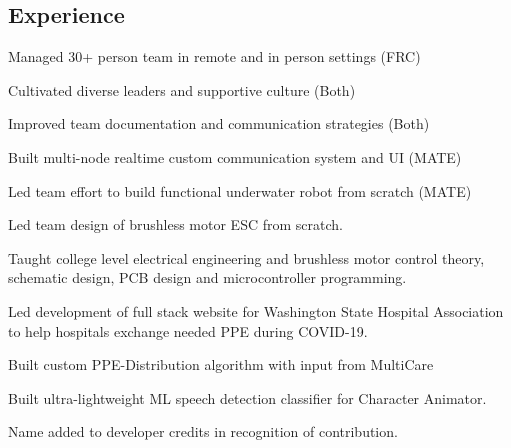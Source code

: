 \documentclass[]{deedy-resume-openfont}
\begin{document}
\begin{paracol}{2}
\section{Experience}
\vspace{\topsep}
\begin{tightemize}
\item Managed 30+ person team in remote and in person settings (FRC)
\item Cultivated diverse leaders and supportive culture (Both)
\item Improved team documentation and communication strategies (Both)
\item Built multi-node realtime custom communication system and UI (MATE)
\item Led team effort to build functional underwater robot from scratch (MATE)
\end{tightemize}
\sectionsep

\vspace{-.05cm} %
\begin{tightemize}
\item Led team design of brushless motor ESC from scratch. 
\item Taught college level electrical engineering and brushless motor control theory, schematic design, PCB design and microcontroller programming.
\end{tightemize}
\sectionsep

\begin{tightemize}
\item Led  development of full stack website for Washington State Hospital Association to help hospitals exchange needed PPE during COVID-19.
\item Built custom PPE-Distribution algorithm with input from MultiCare
\end{tightemize}
\sectionsep

\begin{tightemize}
\item Built ultra-lightweight ML speech detection classifier for Character Animator. 
\item Name added to developer credits in recognition of contribution.
\end{tightemize}
\sectionsep


\end{paracol}
\end{document}
